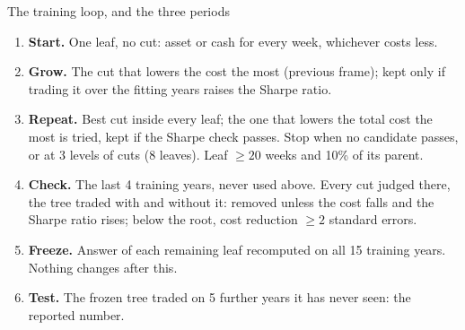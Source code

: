 \documentclass[10pt,aspectratio=169]{beamer}
\newcommand{\1}{\mathbf{1}}
\begin{document}
\begin{frame}{The training loop, and the three periods}
\begin{center}
\end{center}
\footnotesize
\begin{enumerate}
\item \textbf{Start.} One leaf, no cut: asset or cash for every week, whichever costs less.
\item \textbf{Grow.} The cut that lowers the cost the most (previous frame); kept only if trading it over the fitting years raises the Sharpe ratio.
\item \textbf{Repeat.} Best cut inside every leaf; the one that lowers the total cost the most is tried, kept if the Sharpe check passes. Stop when no candidate passes, or at 3 levels of cuts (8 leaves). Leaf $\ge20$ weeks and 10\% of its parent.
\item \textbf{Check.} The last 4 training years, never used above. Every cut judged there, the tree traded with and without it: removed unless the cost falls and the Sharpe ratio rises; below the root, cost reduction $\ge2$ standard errors.
\item \textbf{Freeze.} Answer of each remaining leaf recomputed on all 15 training years. Nothing changes after this.
\item \textbf{Test.} The frozen tree traded on 5 further years it has never seen: the reported number.
\end{enumerate}
\end{frame}
\end{document}
